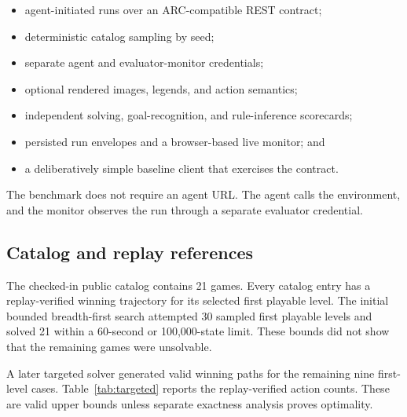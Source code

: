 \documentclass[a4paper,11pt]{article}
\begin{document}
\begin{itemize}[leftmargin=*]
  \item agent-initiated runs over an ARC-compatible REST contract;
  \item deterministic catalog sampling by seed;
  \item separate agent and evaluator-monitor credentials;
  \item optional rendered images, legends, and action semantics;
  \item independent solving, goal-recognition, and rule-inference scorecards;
  \item persisted run envelopes and a browser-based live monitor; and
  \item a deliberatively simple baseline client that exercises the contract.
\end{itemize}

The benchmark does not require an agent URL. The agent calls the environment,
and the monitor observes the run through a separate evaluator credential.

\subsection{Catalog and replay references}

The checked-in public catalog contains 21 games. Every catalog entry has a
replay-verified winning trajectory for its selected first playable level. The
initial bounded breadth-first search attempted 30 sampled first playable levels
and solved 21 within a 60-second or 100,000-state limit. These bounds did not
show that the remaining games were unsolvable.

A later targeted solver generated valid winning paths for the remaining nine
first-level cases. Table~\ref{tab:targeted} reports the replay-verified action
counts. These are valid upper bounds unless separate exactness analysis proves
optimality.
\end{document}
